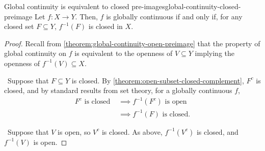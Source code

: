 \documentclass{article}
\newif\ifdraft
\newcommand*\iffforward{\par\boxed\Longrightarrow\ }
\newcommand*\iffbackward{\par\boxed\Longleftarrow\ }
\numberwithin{equation}{section}
\numberwithin{figure}{section}
\begin{document}
\begin{theorem}{Global continuity is equivalent to closed
        pre-images}{global-continuity-closed-preimage}
    Let $ f \colon X \to Y $. Then, $ f $ is globally continuous if and only if,
    for any closed set $ F \subseteq Y $, $ f^{-1}(F) $ is closed in $ X $.
    \begin{proof}
        Recall from \cref{theorem:global-continuity-open-preimage} that the
        property of global continuity on $ f $ is equivalent to the openness of
        $ V \subseteq Y $ implying the openness of $ f^{-1}(V) \subseteq X $.

        \iffforward Suppose that $ F \subseteq Y $ is closed. By
        \cref{theorem:open-subset-closed-complement}, $ F^c $ is closed, and by
        standard results from set theory, for a globally continuous $ f $,
        \begin{align}
            F^c \text{ is closed } &\implies f^{-1}\left(F^c\right) \text{ is
                open} \\
            &\implies f^{-1}(F) \text{ is closed}.
        \end{align}
        \iffbackward Suppose that $ V $ is open, so $ V^c $ is closed. As above,
        $ f^{-1}\left(V^c\right) $ is closed, and $ f^{-1}(V) $ is open.
    \end{proof}
\end{theorem}

\clearpage
\ifdraft\else
\fi
\printbibliography[heading=bibintoc,
    title={Recommended Texts \& Further Reading}]
\end{document}
